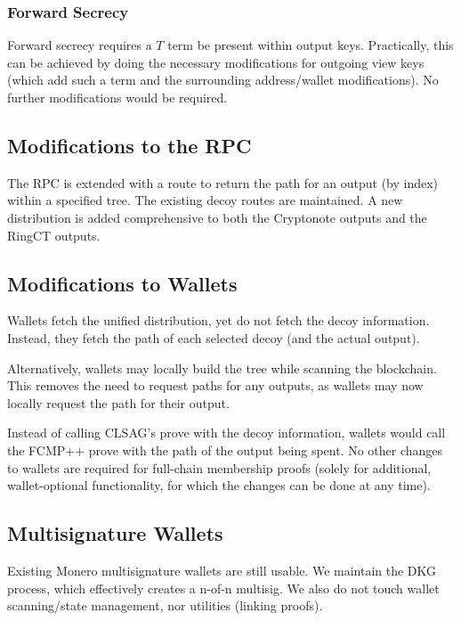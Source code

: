 \documentclass[]{article}
\begin{document}
\subsubsection{Forward Secrecy}

Forward secrecy requires a $T$ term be present within output keys. Practically, this can be achieved by doing the necessary modifications for outgoing view keys (which add such a term and the surrounding address/wallet modifications). No further modifications would be required.

\subsection{Modifications to the RPC}

The RPC is extended with a route to return the path for an output (by index) within a specified tree. The existing decoy routes are maintained. A new distribution is added comprehensive to both the Cryptonote outputs and the RingCT outputs.

\subsection{Modifications to Wallets}

Wallets fetch the unified distribution, yet do not fetch the decoy information. Instead, they fetch the path of each selected decoy (and the actual output).

Alternatively, wallets may locally build the tree while scanning the blockchain. This removes the need to request paths for any outputs, as wallets may now locally request the path for their output.

Instead of calling CLSAG's prove with the decoy information, wallets would call the FCMP++ prove with the path of the output being spent. No other changes to wallets are required for full-chain membership proofs (solely for additional, wallet-optional functionality, for which the changes can be done at any time).

\subsection{Multisignature Wallets}

Existing Monero multisignature wallets are still usable. We maintain the DKG process, which effectively creates a n-of-n multisig. We also do not touch wallet scanning/state management, nor utilities (linking proofs).
\end{document}
